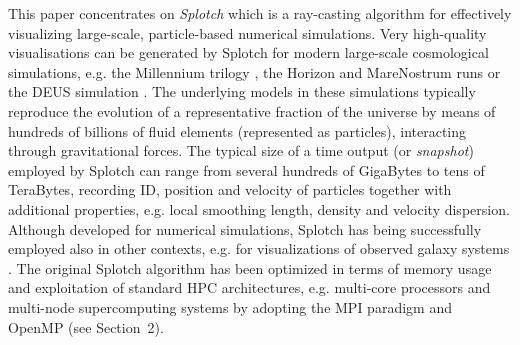 \documentclass[1p]{elsarticle}
\begin{document}
This paper concentrates on {\it Splotch} \cite{2008NJPh...10l5006D} which is a ray-casting algorithm for effectively visualizing large-scale, particle-based numerical simulations. Very high-quality visualisations can be generated by Splotch for modern large-scale cosmological simulations, e.g. the Millennium trilogy \cite{millennium}, the Horizon and MareNostrum runs \cite{horizon} or the DEUS simulation \cite{deus}. The underlying models in these simulations typically reproduce the evolution of a representative fraction of the universe by means of hundreds of billions of fluid elements (represented as particles), interacting through gravitational forces. The typical size of a time output (or {\it snapshot}) employed by Splotch can range from several hundreds of GigaBytes to tens of TeraBytes, recording ID, position and velocity of particles together with additional properties, e.g. local smoothing length, density and velocity dispersion. Although developed for numerical simulations, Splotch has being successfully employed also in other contexts, e.g. for visualizations of observed galaxy systems \cite{m83-vis}.
The original Splotch algorithm has been optimized in terms of memory usage and exploitation of standard HPC architectures, e.g. multi-core processors and multi-node supercomputing systems by adopting the MPI paradigm \cite{jin:high-performance} and OpenMP (see Section~2).
\end{document}
